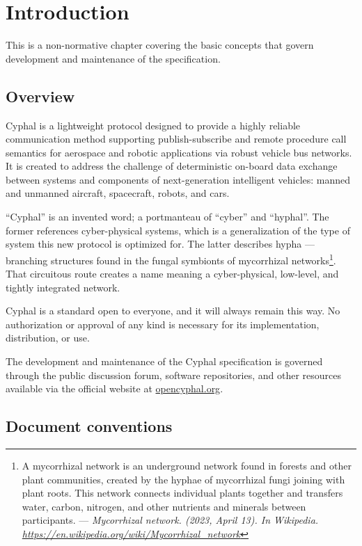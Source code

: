 \chapter{Introduction}\label{sec:introduction}

This is a non-normative chapter covering the basic concepts that govern development and maintenance of
the specification.

\section{Overview}

Cyphal is a lightweight protocol designed to provide a highly reliable communication method
supporting publish-subscribe and remote procedure call semantics
for aerospace and robotic applications via robust vehicle bus networks.
It is created to address the challenge of deterministic on-board data exchange between systems and components
of next-generation intelligent vehicles: manned and unmanned aircraft, spacecraft, robots, and cars.

``Cyphal'' is an invented word; a portmanteau of ``cyber'' and ``hyphal''.
The former references cyber-physical systems,
which is a generalization of the type of system this new protocol is optimized for.
The latter describes hypha --- branching structures found in the fungal symbionts of mycorrhizal networks\footnote{%
    A mycorrhizal network is an underground network found in forests and other plant communities,
    created by the hyphae of mycorrhizal fungi joining with plant roots.
    This network connects individual plants together and transfers water, carbon, nitrogen,
    and other nutrients and minerals between participants.
    ---
    \emph{Mycorrhizal network. (2023, April 13). In Wikipedia. \url{https://en.wikipedia.org/wiki/Mycorrhizal_network}}
}.
That circuitous route creates a name meaning a cyber-physical, low-level, and tightly integrated network.

Cyphal is a standard open to everyone, and it will always remain this way.
No authorization or approval of any kind is necessary for its implementation, distribution, or use.

The development and maintenance of the Cyphal specification is governed through the public discussion forum,
software repositories, and other resources available via the official website at
\href{http://opencyphal.org}{opencyphal.org}.

\section{Document conventions}

